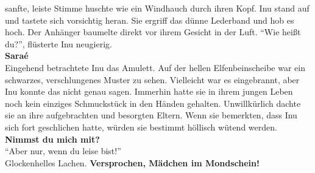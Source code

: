 sanfte, leiste Stimme huschte wie ein Windhauch durch ihren Kopf. Inu stand auf und tastete sich 
vorsichtig heran.  Sie ergriff das dünne Lederband und hob es hoch. Der Anhänger baumelte direkt 
vor ihrem Gesicht in der Luft. ``Wie heißt du?'', flüsterte Inu neugierig.\\
\textbf{Saraé}\\
Eingehend betrachtete Inu das Amulett. Auf der hellen Elfenbeinscheibe war ein schwarzes, 
verschlungenes Muster zu sehen. Vielleicht war es eingebrannt, aber Inu konnte das nicht genau 
sagen. Immerhin hatte sie in ihrem jungen Leben noch kein einziges Schmuckstück in den Händen 
gehalten. Unwillkürlich dachte sie an ihre aufgebrachten und besorgten Eltern. Wenn sie bemerkten, 
dass Inu sich fort geschlichen hatte, würden sie bestimmt höllisch wütend werden.\\
\textbf{Nimmst du mich mit?}\\
``Aber nur, wenn du leise bist!''\\
Glockenhelles Lachen. \textbf{Versprochen, Mädchen im Mondschein!}\\


